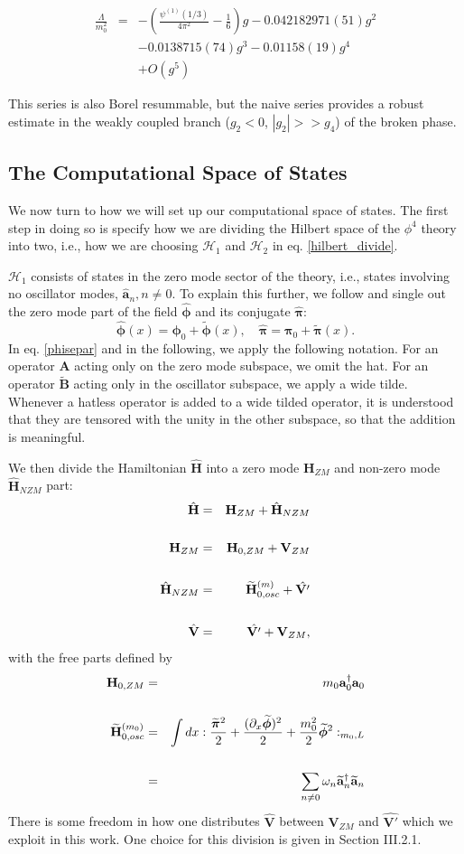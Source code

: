 \documentclass[twocolumn,secnumarabic,amssymb, nobibnotes, aps, prd]{revtex4-2}
\newcommand{\be}{\begin{equation}}
\newcommand{\ee}{\end{equation}}
\newcommand{\bea}{\begin{eqnarray}}
\newcommand{\eea}{\end{eqnarray}}
\begin{document}
\bea
\frac{\Lambda}{m_0^2}&=&-\left(\frac{\psi^{(1)}(1/3)}{4\pi^2}-\frac16\right)g-0.042182971(51)g^2\nonumber \\
&&- 0.0138715(74)g^3-0.01158(19)g^4\nonumber\\
&&+O(g^5)
\eea

This series is also Borel resummable, but the naive series provides a robust estimate in the weakly coupled branch ($g_2<0$, $|g_2|>>g_4$) of the broken phase.


\subsection{The Computational Space of States}

We now turn to how we will set up our computational space of states.  The first step in doing so is specify how we are dividing the Hilbert space of the $\phi^4$ theory into two, i.e., how we are choosing $\mathcal{H}_1$ and $\mathcal{H}_2$ in eq. \ref{hilbert_divide}.  

$\mathcal{H}_1$ consists of states in the zero mode sector of the theory, i.e., states involving no oscillator modes, $\hat{\mathbf{a}}_n, n\neq 0$.  To explain this further, we follow \cite{Rychkov:2015vap, Bajnok:2015bgw} and single out the zero mode part of the field $\hat{\boldsymbol{\phi}}$ and its conjugate $\hat{\boldsymbol{\pi}}$:
\be
\hat{\boldsymbol{\phi}}(x)=\boldsymbol{\phi}_0+\widetilde{\boldsymbol{\phi}}(x),\quad \hat{\boldsymbol{\pi}}=\boldsymbol{\pi}_0+\widetilde{\boldsymbol{\pi}}(x). \label{phisepar}
\ee
In eq. \eqref{phisepar} and in the following, we apply the following notation. For an operator $\mathbf{A}$ acting only on the zero mode subspace, we omit the hat. For an operator $\widetilde{\mathbf{B}}$ acting only in the oscillator subspace, we apply a wide tilde. Whenever a hatless operator is added to a wide tilded operator, it is understood that they are tensored with the unity in the other subspace, so that the addition is meaningful.

We then divide 
the Hamiltonian $\hat{\mathbf{H}}$ into a zero mode $\mathbf{H}_{ZM}$ and non-zero mode
$\hat{\mathbf{H}}_{NZM}$ part:
\begin{eqnarray}%
\hat{\mathbf{H}} &=& \mathbf{H}_{ZM} + \hat{\mathbf{H}}_{NZM}\cr\cr
\mathbf{H}_{ZM}&=&\mathbf{H}_{0,ZM}+\mathbf{V}_{ZM}\cr\cr
\hat{\mathbf{H}}_{NZM}&=&\widetilde{\mathbf{H}}_{0,osc}^{(m)}+ \hat{\mathbf{ V'}}\cr\cr
\hat{\mathbf{V}}&=&\hat{\mathbf{V'}}+\mathbf{V}_{ZM},\label{Vseparation}
\end{eqnarray}
with the free parts defined by
\begin{eqnarray}
  \mathbf{H}_{0,ZM}&=&m_0 \mathbf{a}_0^\dagger \mathbf{a}_0\cr\cr
  \widetilde{\mathbf{H}}_{0,osc}^{(m_0)}&=&\intop dx :\frac{\widetilde{\boldsymbol{\pi}}^2}{2}+\frac{(\partial_x \widetilde{\boldsymbol{\phi}})^2}{2}+\frac{m_0^2}{2}\widetilde{\boldsymbol{\phi}}^2:_{m_0,L}\cr\cr
&=&\sum_{n\neq 0} \omega_n \widetilde{\mathbf{a}}_n^\dagger \widetilde{\mathbf{a}}_n\label{Hnzmdef}  
\end{eqnarray}
There is some freedom in how one distributes $\hat{\mathbf{V}}$ between $\mathbf{V}_{ZM}$ and $\hat{\mathbf{V'}}$ which we exploit in this work.  One choice for this division is given in Section III.2.1.
\end{document}
